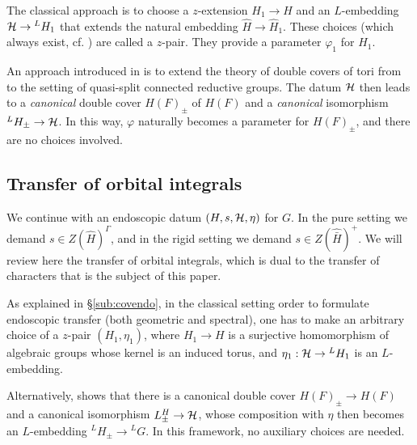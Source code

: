 \documentclass{article}
\theoremstyle{definition}
\numberwithin{equation}{section}
\renewcommand{\-}{\hyp{}}
\begin{document}
The classical approach is to choose a $z$-extension $H_1 \to H$ and an $L$\-embedding $\mathcal{H} \to {^LH_1}$ that extends the natural embedding $\hat H \to \hat H_1$. These choices (which always exist, cf. \cite[\S2.2]{KS99}) are called a $z$-pair. They provide a parameter $\varphi_1$ for $H_1$.

An approach introduced in \cite{KalHDC} is to extend the theory of double covers of tori from \cite{KalDC} to the setting of quasi-split connected reductive groups. The datum $\mathcal{H}$ then leads to a \emph{canonical} double cover $H(F)_\pm$ of $H(F)$ and a \emph{canonical} isomorphism $^LH_\pm \to \mathcal{H}$. In this way, $\varphi$ naturally becomes a parameter for $H(F)_\pm$, and there are no choices involved.

\subsection{Transfer of orbital integrals} \label{sub:transfer}

We continue with an endoscopic datum $(H,s,\mathcal{H},\eta)$ for $G$. In the pure setting we demand $s \in Z(\hat H)^\Gamma$, and in the rigid setting we demand $s \in Z(\hat{\bar H})^+$. We will review here the transfer of orbital integrals, which is dual to the transfer of characters that is the subject of this paper.

As explained in \S\ref{sub:covendo}, in the classical setting order to formulate endoscopic transfer (both geometric and spectral), one has to make an arbitrary choice of a $z$-pair $(H_1,\eta_1)$, where $H_1 \to H$ is a surjective homomorphism of algebraic groups whose kernel is an induced torus, and $\eta_1 : \mathcal{H} \to {^LH_1}$ is an $L$\-embedding. 

Alternatively, \cite{KalHDC} shows that there is a canonical double cover $H(F)_\pm \to H(F)$ and a canonical isomorphism $L^H_\pm \to \mathcal{H}$, whose composition with $\eta$ then becomes an $L$\-embedding $^LH_\pm \to {^LG}$. In this framework, no auxiliary choices are needed.
\end{document}

